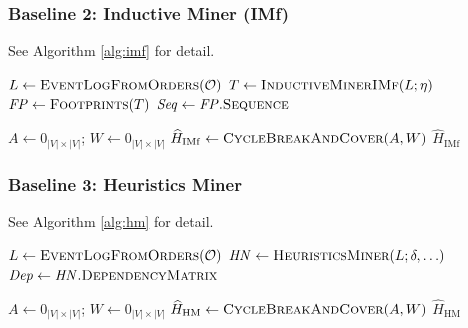 \documentclass{article}
\theoremstyle{plain}
\theoremstyle{definition}
\theoremstyle{remark}
\begin{document}
\subsubsection{Baseline 2: Inductive Miner (IMf)}
See Algorithm \ref{alg:imf} for detail. 
\begin{algorithm2e}[h!]
\footnotesize
\caption{Inductive Miner IMf (process discovery $\rightarrow$ footprints $\rightarrow$ precedence)}
\label{alg:imf}
\DontPrintSemicolon
{}

$L \leftarrow \textsc{EventLogFromOrders}(\mathcal{O})$ 
$T \leftarrow \textsc{InductiveMinerIMf}(L;\eta)$ 
$\mathit{FP} \leftarrow \textsc{Footprints}(T)$ 
$\mathit{Seq} \leftarrow \mathit{FP}.\textsc{Sequence}$ 

$A \leftarrow 0_{|V|\times|V|}$; \quad $W \leftarrow 0_{|V|\times|V|}$\;
$\widehat{H}_{\mathrm{IMf}} \leftarrow \textsc{CycleBreakAndCover}(A,W)$\;
\Return $\widehat{H}_{\mathrm{IMf}}$\;
\end{algorithm2e}


\subsubsection{Baseline 3: Heuristics Miner}
See Algorithm \ref{alg:hm} for detail. 
\begin{algorithm2e}[h!]
\footnotesize
\caption{Heuristics Miner (dependency graph $\rightarrow$ precedence)}
\label{alg:hm}
\DontPrintSemicolon
{}

$L \leftarrow \textsc{EventLogFromOrders}(\mathcal{O})$\;
$\mathit{HN} \leftarrow \textsc{HeuristicsMiner}(L;\delta,\ldots)$\;
$\mathit{Dep} \leftarrow \mathit{HN}.\textsc{DependencyMatrix}$\;

$A \leftarrow 0_{|V|\times|V|}$; \quad $W \leftarrow 0_{|V|\times|V|}$\;
$\widehat{H}_{\mathrm{HM}} \leftarrow \textsc{CycleBreakAndCover}(A,W)$\;
\Return $\widehat{H}_{\mathrm{HM}}$\;
\end{algorithm2e}
\end{document}
